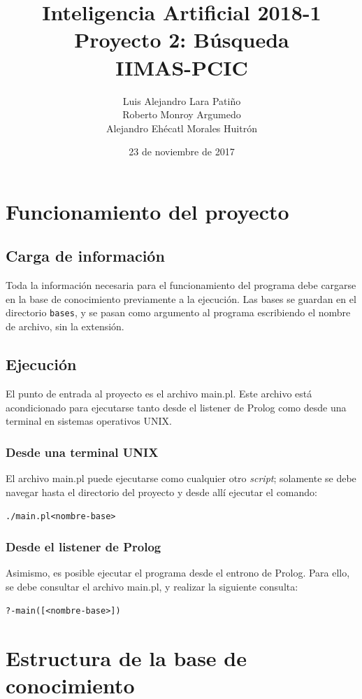 \documentclass[11pt]{article}
\title{Inteligencia Artificial 2018-1 \\ Proyecto 2: Búsqueda\\
\vspace{2mm}
\small{IIMAS-PCIC}}
\author{Luis Alejandro Lara Patiño\\Roberto Monroy Argumedo\\
Alejandro Ehécatl Morales Huitrón}
\date{23 de noviembre de 2017}
\newcommand{\bt}{\begin{alltt}}
\newcommand{\et}{\end{alltt}}
\begin{document}
\maketitle

\tableofcontents

\section{Funcionamiento del proyecto}

\subsection{Carga de información}
Toda la información necesaria para el funcionamiento del programa debe cargarse en la base de conocimiento previamente a la ejecución. Las bases se guardan en el directorio \texttt{bases}, y se pasan como argumento al programa escribiendo el nombre de archivo, sin la extensión.

\subsection{Ejecución}

El punto de entrada al proyecto es el archivo main.pl. Este archivo está acondicionado para ejecutarse tanto desde el listener de Prolog como desde una terminal en sistemas operativos UNIX.

\subsubsection{Desde una terminal UNIX}
El archivo main.pl puede ejecutarse como cualquier otro \textit{script}; solamente se debe navegar hasta el directorio del proyecto y desde allí ejecutar el comando:

\bt
    ./main.pl <nombre-base>
\et

\subsubsection{Desde el listener de Prolog}
Asimismo, es posible ejecutar el programa desde el entrono de Prolog. Para ello, se debe consultar el archivo main.pl, y realizar la siguiente consulta:

\bt
    ?- main([<nombre-base>])
\et

\section{Estructura de la base de conocimiento}
\end{document}
